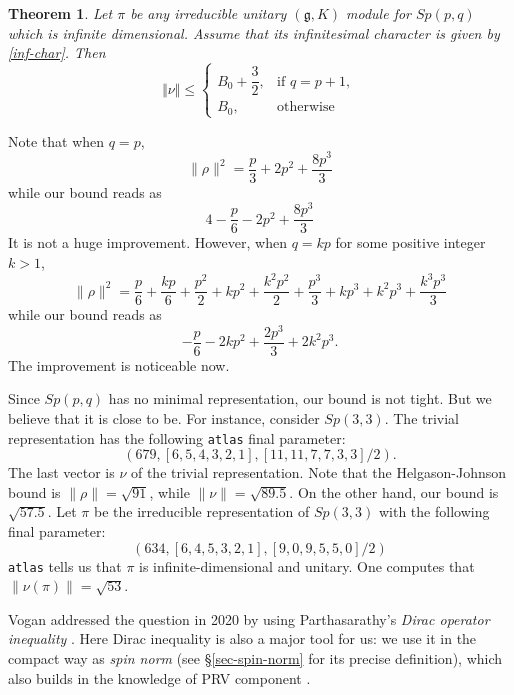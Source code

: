 \documentclass[11pt]{amsart}
\theoremstyle{plain}
\newtheorem{thm}{Theorem}[section]
\theoremstyle{definition}
\newcommand{\frg}{\mathfrak{g}}
\newcommand{\bbZ}{\mathbb{Z}}
\begin{document}
\begin{thm}\label{thm-main}
	Let $\pi$ be any irreducible unitary $(\frg, K)$ module for $Sp(p,q)$ which is infinite dimensional. Assume that its infinitesimal character is given by \eqref{inf-char}. Then
	\[\Vert\nu\Vert\le \left\{
	\begin{array}{ll}
		B_0+\dfrac{3}{2}, & \text{if } q=p+1,\\
		B_0, & \text{otherwise}
	\end{array}
	\right.\]
\end{thm}

Note that when $q=p$,
$$
\|\rho\|^2=\frac{p}{3}+2 p^2+\frac{8 p^3}{3}
$$
while our bound reads as
$$
4-\frac{p}{6}-2 p^2+\frac{8 p^3}{3}
$$
It is not a huge improvement. However, when $q=k p$ for some positive integer $k>1$,
$$
\|\rho\|^2=\frac{p}{6}+\frac{k p}{6}+\frac{p^2}{2}+k p^2+\frac{k^2 p^2}{2}+\frac{p^3}{3}+k p^3+k^2 p^3+\frac{k^3 p^3}{3}
$$
while our bound reads as
$$
-\frac{p}{6}-2 k p^2+\frac{2 p^3}{3}+2 k^2 p^3.
$$
The improvement is noticeable now.

Since $Sp(p, q)$ has no minimal representation, our bound is not tight. But we believe that it is close to be.
For instance, consider $Sp(3, 3)$. The trivial representation has the following \texttt{atlas} \cite{ALTV,At} final parameter:
$$
(679, [6,5,4,3,2,1], [11,11,7,7,3,3]/2).
$$
The last vector is $\nu$ of the trivial representation. Note that the Helgason-Johnson bound is $\|\rho\|=\sqrt{91}$, while $\|\nu\|=\sqrt{89.5}$. On the other hand, our bound is $\sqrt{57.5}$. Let $\pi$ be the irreducible representation of $Sp(3, 3)$ with the following final parameter:
$$
(634, [6,4,5,3,2,1], [9,0,9,5,5,0]/2)
$$
\texttt{atlas} tells us that $\pi$ is infinite-dimensional and unitary.
One computes that $\|\nu(\pi)\|=\sqrt{53}$.


Vogan addressed the question in 2020 \cite{V20-1, V20-2} by using Parthasarathy's \emph{Dirac operator inequality} \cite{Pa72, Pa80}. Here Dirac inequality is also a major tool for us: we use it in the compact way as \emph{spin norm} (see \S \ref{sec-spin-norm} for its precise definition), which also builds in the knowledge of PRV component \cite{PRV}.

\end{document}

